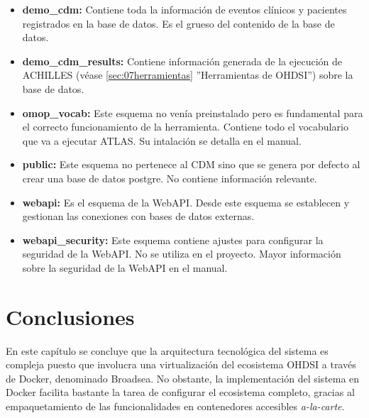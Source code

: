 \begin{itemize}
    \item \textbf{demo\_cdm:} Contiene toda la información de eventos clínicos y pacientes registrados en la base de datos. Es el grueso del contenido de la base de datos.
    \item \textbf{demo\_cdm\_results:} Contiene información generada de la ejecución de ACHILLES (véase \ref{sec:07herramientas} ''Herramientas de OHDSI'') sobre la base de datos.
    \item \textbf{omop\_vocab:} Este esquema no venía preinstalado pero es fundamental para el correcto funcionamiento de la herramienta. Contiene todo el vocabulario que va a ejecutar ATLAS. Su intalación se detalla en el manual.
    \item \textbf{public:} Este esquema no pertenece al CDM sino que se genera por defecto al crear una base de datos postgre. No contiene información relevante.
    \item \textbf{webapi:} Es el esquema de la WebAPI. Desde este esquema se establecen y gestionan las conexiones con bases de datos externas.
    \item \textbf{webapi\_security:} Este esquema contiene ajustes para configurar la seguridad de la WebAPI. No se utiliza en el proyecto. Mayor información sobre la seguridad de la WebAPI en el manual.
\end{itemize}


\section{Conclusiones} \label{sec:08conclusiones}

En este capítulo se concluye que la arquitectura tecnológica del sistema es compleja puesto que involucra una virtualización del ecosistema OHDSI a través de Docker, denominado Broadsea. No obstante, la implementación del sistema en Docker facilita bastante la tarea de configurar el ecosistema completo, gracias al empaquetamiento de las funcionalidades en contenedores accesibles \textit{a-la-carte}. 